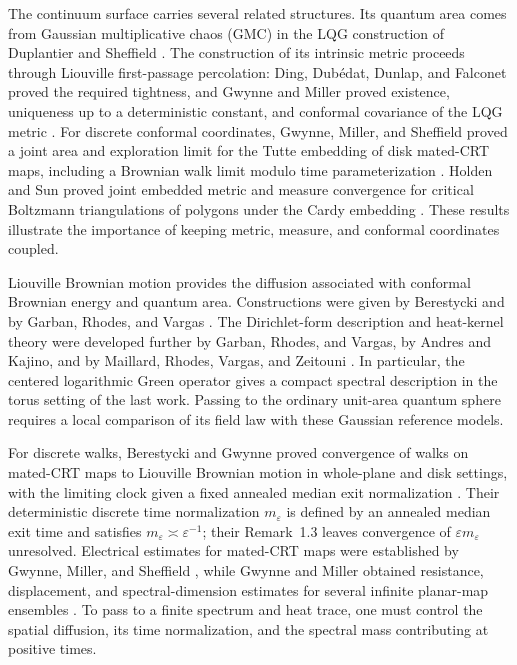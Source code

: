 The continuum surface carries several related structures.  Its quantum area
comes from Gaussian multiplicative chaos (GMC) in the LQG construction of
Duplantier and Sheffield \cite{DuplantierSheffield2011KPZ}.  The construction of its intrinsic
metric proceeds through Liouville first-passage percolation: Ding, Dub\'edat,
Dunlap, and Falconet proved the required tightness, and Gwynne and Miller
proved existence, uniqueness up to a deterministic constant, and conformal
covariance of the LQG metric
\cite{DingDubedatDunlapFalconet2020Tightness,GwynneMiller2021Metric,GwynneMiller2021ConformalMetric}.
For discrete conformal coordinates, Gwynne, Miller, and Sheffield proved a
joint area and exploration limit for the Tutte embedding of disk mated-CRT maps,
including a Brownian walk limit modulo time parameterization
\cite{GwynneMillerSheffield2021Tutte}.  Holden and Sun proved joint embedded
metric and measure convergence for critical Boltzmann triangulations of polygons under
the Cardy embedding \cite{HoldenSun2023Cardy}.  These results illustrate the
importance of keeping metric, measure, and conformal coordinates coupled.

Liouville Brownian motion provides the diffusion associated with conformal
Brownian energy and quantum area.  Constructions were given by Berestycki and
by Garban, Rhodes, and Vargas
\cite{Berestycki2015Diffusion,GarbanRhodesVargas2016LBM}.  The Dirichlet-form
description and heat-kernel theory were developed further by Garban, Rhodes,
and Vargas, by Andres and Kajino, and by Maillard, Rhodes, Vargas, and
Zeitouni
\cite{GarbanRhodesVargas2014Dirichlet,AndresKajino2016Heat,MaillardRhodesVargasZeitouni2016Heat}.
In particular, the centered logarithmic Green operator gives a compact
spectral description in the torus setting of the last work.  Passing to the
ordinary unit-area quantum sphere requires a local comparison of its field
law with these Gaussian reference models.

For discrete walks, Berestycki and Gwynne proved convergence of walks on
mated-CRT maps to Liouville Brownian motion in whole-plane and disk settings,
with the limiting clock given a fixed annealed median exit normalization
\cite[Equation~(1.6) and Theorems~1.2 and~1.4]{BerestyckiGwynne2022MatedCRTLBM}.
Their deterministic discrete time normalization \(m_\varepsilon\) is defined by an
annealed median exit time and satisfies
\(m_\varepsilon\asymp\varepsilon^{-1}\); their Remark~1.3 leaves convergence
of \(\varepsilon m_\varepsilon\) unresolved.  Electrical estimates for
mated-CRT maps were established by Gwynne, Miller, and Sheffield
\cite{GwynneMillerSheffield2019Harmonic}, while Gwynne and Miller obtained
resistance, displacement, and spectral-dimension estimates for several
infinite planar-map ensembles \cite{GwynneMiller2021RandomWalk}.
To pass to a finite spectrum and heat trace, one must control the spatial
diffusion, its time normalization, and the spectral mass contributing at
positive times.

